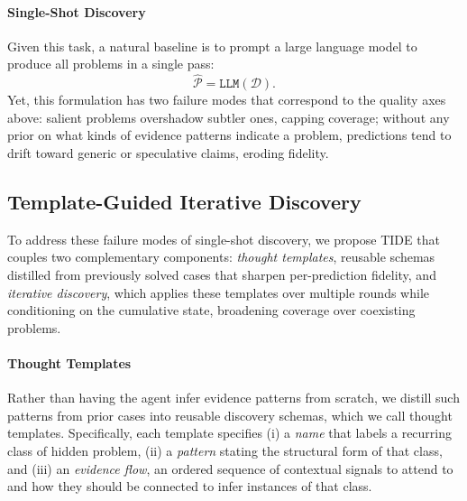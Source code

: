 \documentclass{llmxive}
\begin{document}
\paragraph{Single-Shot Discovery}
Given this task, a natural baseline is to prompt a large language model to produce all problems in a single pass:
\[
\hat{\mathcal{P}} = \texttt{LLM}(\mathcal{D}).
\]
Yet, this formulation has two failure modes that correspond to the quality axes above: salient problems overshadow subtler ones, capping coverage; without any prior on what kinds of evidence patterns indicate a problem, predictions tend to drift toward generic or speculative claims, eroding fidelity.

\subsection{Template-Guided Iterative Discovery}
\label{sec:method_main}

To address these failure modes of single-shot discovery, we propose \textsc{TIDE} that couples two complementary components: \textit{thought templates}, reusable schemas distilled from previously solved cases that sharpen per-prediction fidelity, and \textit{iterative discovery}, which applies these templates over multiple rounds while conditioning on the cumulative state, broadening coverage over coexisting problems.

\paragraph{Thought Templates}
Rather than having the agent infer evidence patterns from scratch, we distill such patterns from prior cases into reusable discovery schemas, which we call thought templates. Specifically, each template specifies (i) a \emph{name} that labels a recurring class of hidden problem, (ii) a \emph{pattern} stating the structural form of that class, and (iii) an \emph{evidence flow}, an ordered sequence of contextual signals to attend to and how they should be connected to infer instances of that class.
\end{document}

